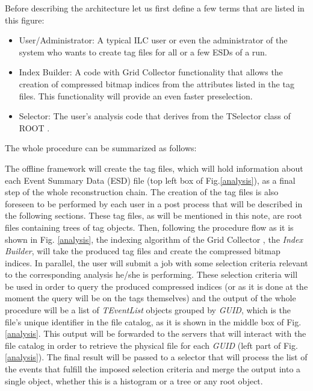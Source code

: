 \documentclass[12pt,a4paper,twoside]{article}
\begin{document}
{Before describing the architecture let us first define a few terms
that are listed in this figure:

\begin{itemize}

\item User/Administrator: A typical ILC user or even the
  administrator of the system who wants to create tag files for all or
  a few ESDs \cite{CompTDR} of a run.


\item Index Builder: A code with Grid Collector \cite{GC1,GC2}
  functionality that allows the creation of compressed bitmap indices
  from the attributes listed in the tag files. This functionality will
  provide an even faster preselection.


\item Selector: The user's analysis code that derives from the
  TSelector class of ROOT \cite{RootSelector}.


\end{itemize}

The whole procedure can be summarized as follows:

The offline framework will create the tag files, which will hold
information about each Event Summary Data (ESD) file (top left box of
Fig.\ref{analysis}), as a final step of the whole reconstruction
chain. The creation of the tag files is also foreseen to be performed
by each user in a post process that will be described in the following
sections. These tag files, as will be mentioned in this note, are root
files containing trees of tag objects. Then, following the procedure
flow as it is shown in Fig. \ref{analysis}, the indexing algorithm of
the Grid Collector \cite{GC1,GC2}, the \textit{Index Builder}, will
take the produced tag files and create the compressed bitmap
indices. In parallel, the user will submit a job with some selection
criteria relevant to the corresponding analysis he/she is
performing. These selection criteria will be used in order to query
the produced compressed indices (or as it is done at the moment the
query will be on the tags themselves) and the output of the whole
procedure will be a list of \textit{TEventList} objects grouped by
\textit{GUID}, which is the file's unique identifier in the file
catalog, as it is shown in the middle box of Fig.\ref{analysis}. This
output will be forwarded to the servers that will interact with the
file catalog in order to retrieve the physical file for each
\textit{GUID} (left part of Fig. \ref{analysis}). The final result
will be passed to a selector \cite{RootSelector} that will process the
list of the events that fulfill the imposed selection criteria and
merge the output into a single object, whether this is a histogram or
a tree or any root object. 

}
\end{document}
